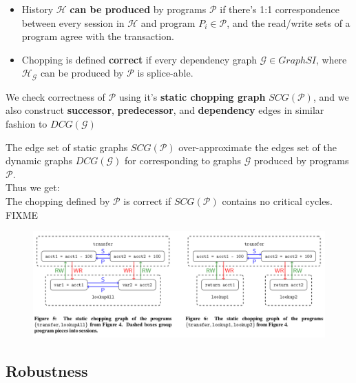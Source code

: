 \documentclass{beamer}
\begin{document}
\begin{frame}
\begin{itemize}
\item History $\mathcal{H}$ \textbf{can be produced} by programs $\mathcal{P}$ if there's 1:1 correspondence between every session in $\mathcal{H}$ and program $P_i\in\mathcal{P}$, and the read/write sets of a program agree with the transaction.
\item Chopping is defined \textbf{correct} if every dependency graph $\mathcal{G}\in GraphSI$, where $\mathcal{H}_\mathcal{G}$ can be produced by $\mathcal{P}$ is splice-able.
\end{itemize}
\end{frame}

\begin{frame}
We check correctness of $\mathcal{P}$ using it's \textbf{static chopping graph} $SCG(\mathcal{P})$, and we also construct \textbf{successor}, \textbf{predecessor}, and \textbf{dependency} edges in similar fashion to $DCG(\mathcal{G})$
\end{frame}

\begin{frame}
The edge set of static graphs $SCG(\mathcal{P})$ over-approximate the edges set of the dynamic graphs $DCG(\mathcal{G})$ for corresponding to graphs $\mathcal{G}$ produced by programs $\mathcal{P}$. \\
Thus we get: \\
The chopping defined by $\mathcal{P}$ is correct if $SCG(\mathcal{P})$ contains no critical cycles.
\\ FIXME
\end{frame}

\begin{frame}
\begin{figure}
\includegraphics[scale=0.28]{fig56}
\end{figure}
\end{frame}


\subsection{Robustness}
\end{document}
